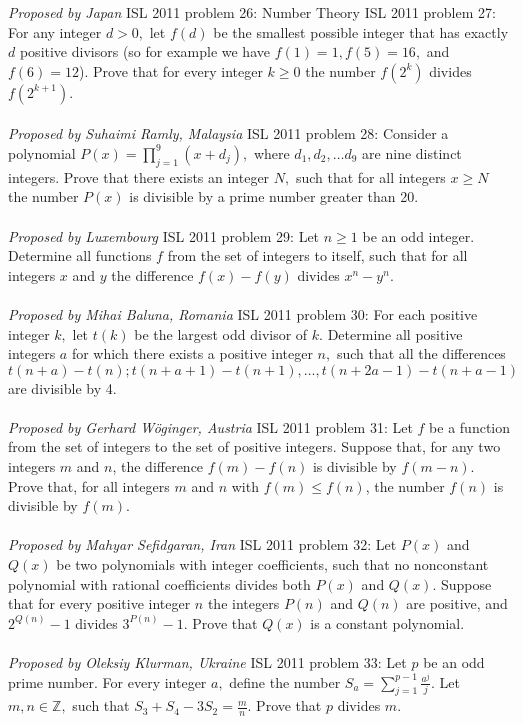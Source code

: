 \textit{Proposed by Japan} 
ISL 2011 problem 26:  Number Theory 
ISL 2011 problem 27:  For any integer $d > 0,$ let $f(d)$ be the smallest possible integer that has exactly $d$ positive divisors (so for example we have $f(1)=1, f(5)=16,$ and $f(6)=12$). Prove that for every integer $k \geq 0$ the number $f\left(2^k\right)$ divides $f\left(2^{k+1}\right).$ \\\\
\textit{Proposed by Suhaimi Ramly, Malaysia} 
ISL 2011 problem 28:  Consider a polynomial $P(x) =  \prod^9_{j=1}(x+d_j),$ where $d_1, d_2, \ldots d_9$ are nine distinct integers. Prove that there exists an integer $N,$ such that for all integers $x \geq N$ the number $P(x)$ is divisible by a prime number greater than 20. \\\\
\textit{Proposed by Luxembourg} 
ISL 2011 problem 29:  Let $n \geq 1$ be an odd integer. Determine all functions $f$ from the set of integers to itself, such that for all integers $x$ and $y$ the difference $f(x)-f(y)$ divides $x^n-y^n.$ \\\\
\textit{Proposed by Mihai Baluna, Romania} 
ISL 2011 problem 30:  For each positive integer $k,$ let $t(k)$ be the largest odd divisor of $k.$ Determine all positive integers $a$ for which there exists a positive integer $n,$ such that all the differences
\[ t(n+a)-t(n); t(n+a+1)-t(n+1), \ldots, t(n+2a-1)-t(n+a-1) \]
are divisible by 4. \\\\
\textit{Proposed by Gerhard Wöginger, Austria} 
ISL 2011 problem 31:  Let $f$ be a function from the set of integers to the set of positive integers. Suppose that, for any two integers $m$ and $n$, the difference $f(m) - f(n)$ is divisible by $f(m- n)$. Prove that, for all integers $m$ and $n$ with $f(m) \leq f(n)$, the number $f(n)$ is divisible by $f(m)$. \\\\
\textit{Proposed by Mahyar Sefidgaran, Iran} 
ISL 2011 problem 32:  Let $P(x)$ and $Q(x)$ be two polynomials with integer coefficients, such that no nonconstant polynomial with rational coefficients divides both $P(x)$ and $Q(x).$ Suppose that for every positive integer $n$ the integers $P(n)$ and $Q(n)$ are positive, and $2^{Q(n)}-1$ divides $3^{P(n)}-1.$ Prove that $Q(x)$ is a constant polynomial. \\\\
\textit{Proposed by Oleksiy Klurman, Ukraine} 
ISL 2011 problem 33:  Let $p$ be an odd prime number. For every integer $a,$ define the number $S_a = \sum^{p-1}_{j=1} \frac{a^j}{j}.$ Let $m,n \in \mathbb{Z},$ such that $S_3 + S_4 - 3S_2 = \frac{m}{n}.$ Prove that $p$ divides $m.$ \\\\
